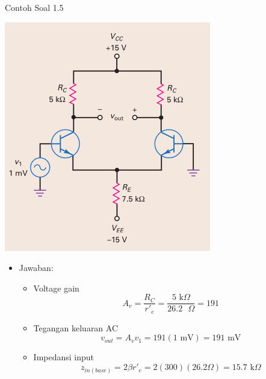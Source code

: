 \documentclass[aspectratio=169]{beamer}
\begin{document}
\begin{frame}{Contoh Soal 1.5}
	\begin{multicols}{2}
		\begin{center}
			\includegraphics[height=0.7\textheight]{gambar/01.contoh_soal_1-2}
		\end{center}
		\columnbreak
		\begin{itemize}
			\item Jawaban:
			\begin{itemize}
				\item Voltage gain
				\[ A_v = \frac{R_C}{r'_e} = \frac{5 \text{ k}\Omega }{26.2 \text{ }\Omega } = 191 \]
				\item Tegangan keluaran AC
				\[ v_{out} = A_v v_1 = 191(1 \text{ mV}) = 191 \text{ mV} \]
				\item Impedansi input
				\[ z_{in(base)} = 2 \beta r'_e = 2(300)(26.2\Omega) = 15.7 \text{ k}\Omega\]
			\end{itemize}
		\end{itemize}
	\end{multicols}
\end{frame}
\end{document}
